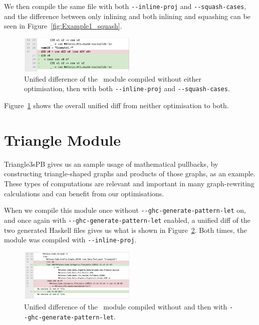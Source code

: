 We then compile the same file with both \texttt{-{}-inline-proj} and \texttt{-{}-squash-cases}, and the difference between only inlining and both inlining and squashing can be seen in Figure~\ref{fig:Example1_squash}.

\begin{figure}[h!]
    \centering
    \includegraphics[width=0.5\textwidth]{Figures/Example1_inline_squash}
    \caption{Unified difference of the ~module compiled without either optimisation, then with both \texttt{-{}-inline-proj} and \texttt{-{}-squash-cases}.}
    \label{fig:Example1_inline_squash}
\end{figure}

Figure~\ref{fig:Example1_inline_squash} shows the overall unified diff from neither optimisation to both.

\newpage

\section{Triangle Module}

Triangle3sPB gives us an sample usage of mathematical pullbacks, by constructing triangle-shaped graphs and products of those graphs, as an example. These types of computations are relevant and important in many graph-rewriting calculations and can benefit from our optimisations.

When we compile this module once without \texttt{-{}-ghc-generate-pattern-let} on, and once again with \texttt{-{}-ghc-generate-pattern-let} enabled, a unified diff of the two generated Haskell files gives us what is shown in Figure~\ref{fig:Triangle_genplet}. Both times, the module was compiled with \texttt{-{}-inline-proj}.

\begin{figure}[h]
    \centering
    \includegraphics[width=0.5\textwidth]{Figures/Triangle_genplet}
    \caption{Unified difference of the ~module compiled without and then with \texttt{-{}-ghc-generate-pattern-let}.}
    \label{fig:Triangle_genplet}
\end{figure}

